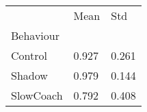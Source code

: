 \begin{tabular}{lll}
\toprule
{} &  Mean &   Std \\
Behaviour &       &       \\
\midrule
Control   & 0.927 & 0.261 \\
Shadow    & 0.979 & 0.144 \\
SlowCoach & 0.792 & 0.408 \\
\bottomrule
\end{tabular}
